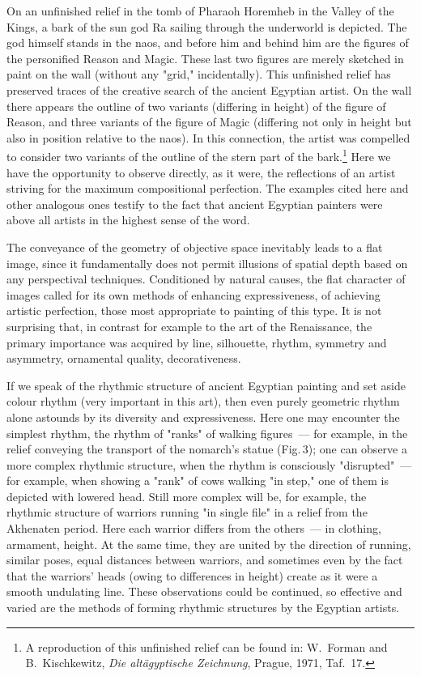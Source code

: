 

On an unfinished relief in the tomb of Pharaoh Horemheb in the Valley of the Kings,
a bark of the sun god Ra sailing through the underworld is depicted. The god himself
stands in the naos, and before him and behind him are the figures of the personified
Reason and Magic. These last two figures are merely sketched in paint on the wall
(without any "grid," incidentally). This unfinished relief has preserved traces of the
creative search of the ancient Egyptian artist. On the wall there appears the outline of
two variants (differing in height) of the figure of Reason, and three variants of the
figure of Magic (differing not only in height but also in position relative to the naos).
In this connection, the artist was compelled to consider two variants of the outline of
the stern part of the bark.\footnote{%
  A reproduction of this unfinished relief can be found in: W.~Forman and
  B.~Kischkewitz, \textit{Die altägyptische Zeichnung}, Prague, 1971, Taf.~17.}
Here we have the opportunity to observe directly, as it were, the reflections of an artist
striving for the maximum compositional perfection. The examples cited here and other
analogous ones testify to the fact that ancient Egyptian painters were above all artists
in the highest sense of the word.

The conveyance of the geometry of objective space inevitably leads to a flat image,
since it fundamentally does not permit illusions of spatial depth based on any
perspectival techniques. Conditioned by natural causes, the flat character of images
called for its own methods of enhancing expressiveness, of achieving artistic perfection,
those most appropriate to painting of this type. It is not surprising that, in contrast for
example to the art of the Renaissance, the primary importance was acquired by line,
silhouette, rhythm, symmetry and asymmetry, ornamental quality, decorativeness.

If we speak of the rhythmic structure of ancient Egyptian painting and set aside colour
rhythm (very important in this art), then even purely geometric rhythm alone astounds
by its diversity and expressiveness. Here one may encounter the simplest rhythm, the
rhythm of "ranks" of walking figures~--- for example, in the relief conveying the
transport of the nomarch's statue (Fig.\,3); one can observe a more complex rhythmic
structure, when the rhythm is consciously "disrupted"~--- for example, when showing
a "rank" of cows walking "in step," one of them is depicted with lowered head. Still more
complex will be, for example, the rhythmic structure of warriors running "in single file"
in a relief from the Akhenaten period. Here each warrior differs from the others~---
in clothing, armament, height. At the same time, they are united by the direction of
running, similar poses, equal distances between warriors, and sometimes even by the
fact that the warriors' heads (owing to differences in height) create as it were a smooth
undulating line. These observations could be continued, so effective and varied are the
methods of forming rhythmic structures by the Egyptian artists.

